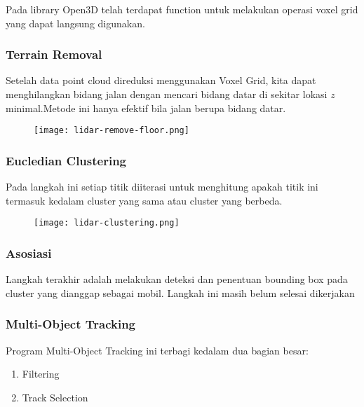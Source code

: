 \begin{frame}[allowframebreaks]
    

    Pada library Open3D telah terdapat function untuk melakukan operasi voxel grid yang dapat langsung digunakan. 
\end{frame}


\begin{frame}
    \frametitle{Terrain Removal}

    Setelah data point cloud direduksi menggunakan Voxel Grid, kita dapat menghilangkan bidang jalan dengan mencari bidang datar di sekitar lokasi $z$ minimal.Metode ini hanya efektif bila jalan berupa bidang datar.
    \begin{figure}
        \centering
        \texttt{[image: lidar-remove-floor.png]}
    \end{figure}
\end{frame}


\begin{frame}[allowframebreaks]
    
\end{frame}


\begin{frame}
    \frametitle{Eucledian Clustering}

    Pada langkah ini setiap titik diiterasi untuk menghitung apakah titik ini termasuk kedalam cluster yang sama atau cluster yang berbeda.
    \begin{figure}
        \centering
        \texttt{[image: lidar-clustering.png]}
    \end{figure}
\end{frame}


\begin{frame}
    \frametitle{Asosiasi}

    Langkah terakhir adalah melakukan deteksi dan penentuan bounding box pada cluster yang dianggap sebagai mobil. Langkah ini masih belum selesai dikerjakan
\end{frame}


\begin{frame}
    \frametitle{Multi-Object Tracking}

    Program Multi-Object Tracking ini terbagi kedalam dua bagian besar:
    \begin{enumerate}
        \item Filtering
        \item Track Selection
    \end{enumerate}
\end{frame}



